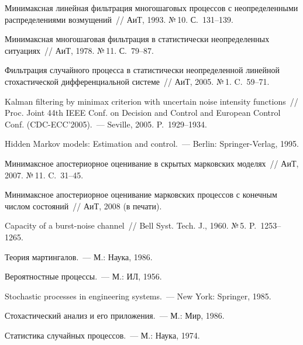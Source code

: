 \begin{multicols}{2}
{{\begin{thebibliography}{99}
 Минимаксная линейная фильтрация многошаговых процессов с
 неопределенными распределениями возмущений~//
 АиТ, 1993. №\,10. С.~\mbox{131--139}.

 Минимаксная
 многошаговая фильтрация в статистически неопределенных ситуациях~//
 АиТ, 1978. №\,11. С.~\mbox{79--87}.


 Фильтрация случайного процесса в статистически
 неопределенной линейной стохастической дифференциальной системе~//
 АиТ, 2005. №\,1. C.~\mbox{59--71}.

 Kalman filtering by
minimax criterion with uncertain noise intensity functions~// Proc.
Joint 44th IEEE Conf. on Decision and Control and European Control
Conf. (CDC-ECC'2005).~--- Seville, 2005. P.~\mbox{1929--1934}.

Hidden Markov
models: Estimation and control.~--- Berlin: Springer-Verlag, 1995.

 Минимаксное апостериорное оценивание в скрытых марковских моделях~//
 АиТ, 2007. №\,11. C.~\mbox{31--45}.

 Минимаксное апостериорное оценивание марковских процессов с конечным
 числом состояний~// АиТ, 2008 (в печати).

Capacity of a burst-noise channel~//
Bell Syst. Tech. J., 1960. №\,5. P.~\mbox{1253--1265}.

 Теория мартингалов.~--- М.: Наука, 1986.

 Вероятностные процессы.~--- М.: ИЛ, 1956.

 Stochastic processes in engineering systems.~--- New York: Springer, 1985.

 Стохастический анализ и его приложения.~--- М.: Мир, 1986.

 Статистика случайных процессов.~--- М.: Наука, 1974.
\end{thebibliography}

}
}

\end{multicols}


\label{end\stat}